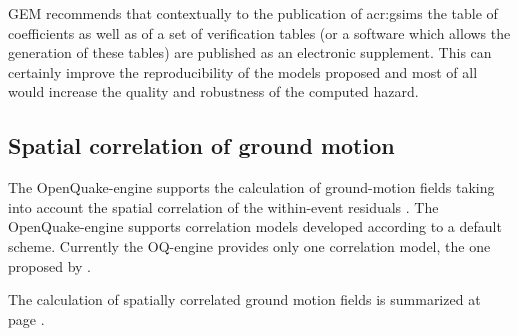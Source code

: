 GEM recommends that contextually to the publication of \glspl{acr:gsim} the
table of coefficients as well as of a set of verification tables (or a software
which allows the generation of these tables) are published as an electronic
supplement. This can certainly improve the reproducibility of the models
proposed and most of all would increase the quality and robustness of the
computed hazard.
%
%
%
\subsection{Spatial correlation of ground motion}
%
The OpenQuake-engine supports the calculation of ground-motion fields taking
into account the spatial correlation of the within-event residuals
\citep{boore2003}.
%
The OpenQuake-engine supports correlation models developed according to a
default scheme. Currently the OQ-engine provides only one correlation model, the
one proposed by \citet{jayaram2009}.

The calculation of spatially correlated ground motion fields is summarized at
page \pageref{sec:event_based}.
